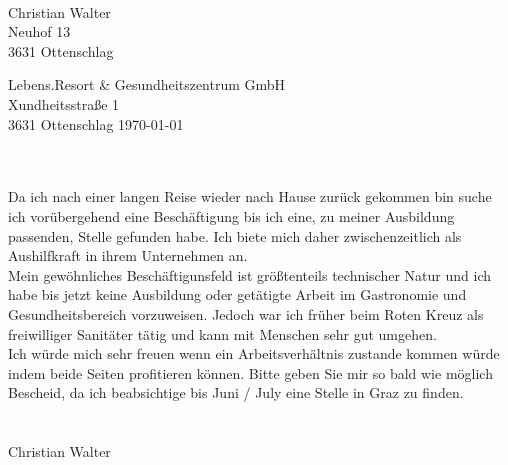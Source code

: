 \documentclass[11pt, a4paper]{article}
\begin{document}
\vspace*{1cm}
\begin{center}
  \\
\end{center}

\vspace{1cm}
Christian Walter\\
Neuhof 13\\
3631 Ottenschlag\\
\vspace{1cm}

Lebens.Resort \& Gesundheitszentrum GmbH\\
Xundheitsstraße 1\\
3631 Ottenschlag\hfill
\today\\
\vspace{1cm}

\\\\
Da ich nach einer langen Reise wieder nach Hause zurück gekommen bin suche ich vorübergehend eine Beschäftigung bis ich eine, zu meiner Ausbildung passenden, Stelle gefunden habe. Ich biete mich daher zwischenzeitlich als Aushilfkraft in ihrem Unternehmen an.\\
Mein gewöhnliches Beschäftigunsfeld ist größtenteils technischer Natur und ich habe bis jetzt keine Ausbildung oder getätigte Arbeit im Gastronomie und Gesundheitsbereich vorzuweisen. Jedoch war ich früher beim Roten Kreuz als freiwilliger Sanitäter tätig und kann mit Menschen sehr gut umgehen.\\
Ich würde mich sehr freuen wenn ein Arbeitsverhältnis zustande kommen würde indem beide Seiten profitieren können.
Bitte geben Sie mir so bald wie möglich Bescheid, da ich beabsichtige bis Juni / July eine Stelle in Graz zu finden.\\

\\\\ Christian Walter
\end{document}
